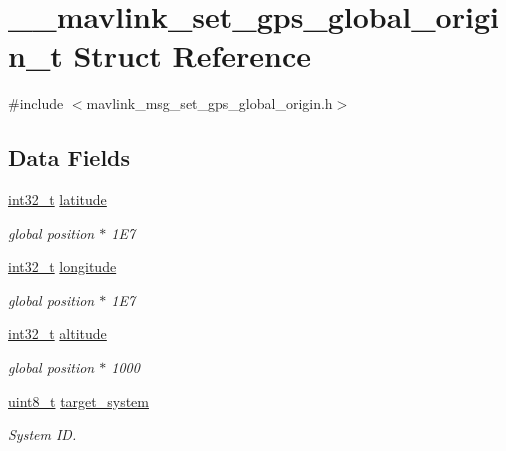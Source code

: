 \hypertarget{struct____mavlink__set__gps__global__origin__t}{\section{\-\_\-\-\_\-mavlink\-\_\-set\-\_\-gps\-\_\-global\-\_\-origin\-\_\-t Struct Reference}
\label{struct____mavlink__set__gps__global__origin__t}
}


{\ttfamily \#include $<$mavlink\-\_\-msg\-\_\-set\-\_\-gps\-\_\-global\-\_\-origin.\-h$>$}

\subsection*{Data Fields}
\begin{DoxyCompactItemize}
\item 
\hyperlink{group___n_a_m_e_gafd12020da5a235dfcf0c3c748fb5baed}{int32\-\_\-t} \hyperlink{struct____mavlink__set__gps__global__origin__t_aae0adf1cfbd99eef18d9d43fdb0418dd}{latitude}
\begin{DoxyCompactList}\small\item\em global position $\ast$ 1\-E7 \end{DoxyCompactList}\item 
\hyperlink{group___n_a_m_e_gafd12020da5a235dfcf0c3c748fb5baed}{int32\-\_\-t} \hyperlink{struct____mavlink__set__gps__global__origin__t_a1558c474ba2b7f246bb22f170677f4d3}{longitude}
\begin{DoxyCompactList}\small\item\em global position $\ast$ 1\-E7 \end{DoxyCompactList}\item 
\hyperlink{group___n_a_m_e_gafd12020da5a235dfcf0c3c748fb5baed}{int32\-\_\-t} \hyperlink{struct____mavlink__set__gps__global__origin__t_ae86e137844aafd0a7fc6502b355cd0a2}{altitude}
\begin{DoxyCompactList}\small\item\em global position $\ast$ 1000 \end{DoxyCompactList}\item 
\hyperlink{stdint_8h_aba7bc1797add20fe3efdf37ced1182c5}{uint8\-\_\-t} \hyperlink{struct____mavlink__set__gps__global__origin__t_a8b0950dbed98f3f0515bb5726bc5184c}{target\-\_\-system}
\begin{DoxyCompactList}\small\item\em System I\-D. \end{DoxyCompactList}\end{DoxyCompactItemize}



